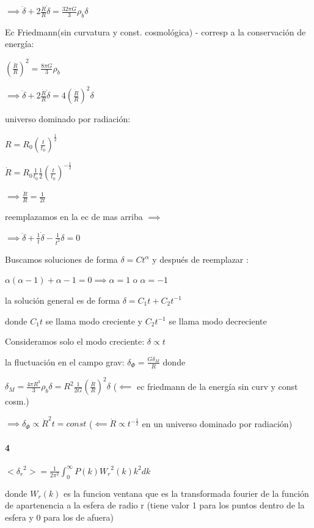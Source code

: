 \documentclass[12pt]{book}
\begin{document}
$\implies  \ddot{\delta} + 2  \frac{\dot{R}}{R} \dot{\delta} =  \frac{32 \pi G}{3}  \rho_b \delta $

Ec Friedmann(sin curvatura y const. cosmológica) - corresp a la conservación de energía:

$(\frac{\dot{R}}{R})^2 = \frac{8 \pi G }{3} \rho_b$

$\implies \ddot{\delta} + 2  \frac{\dot{R}}{R} \dot{\delta}  = 4 (\frac{\dot{R}}{R})^2 \delta$

universo dominado por radiación:

$R=R_0(\frac{t}{t_0})^{\frac{1}{2}}$

$\dot{R}=R_0\frac{1}{t_0}\frac{1}{2} (\frac{t}{t_0})^{-\frac{1}{2}}$

$\implies \frac{\dot{R}}{R} = \frac{1}{2t}$

reemplazamos en la ec de mas  arriba $\implies$

$\implies \ddot{\delta} +   \frac{1}{t} \dot{\delta}  -  \frac{1}{t^2} \delta = 0$

Buscamos soluciones de forma $\delta = C t^{\alpha}$ y después de reemplazar :

$\alpha(\alpha-1) + \alpha -1 = 0 \implies \alpha = 1$ o $\alpha = -1$

la solución general es de forma $\delta = C_1 t + C_2 t^{-1}$ 

donde $C_1 t $ se llama modo creciente y $ C_2 t^{-1}$ se llama modo decreciente

Consideramos solo el modo creciente: $\delta \propto  t$

la fluctuación en el campo grav:  $\delta_{\Phi} = \frac{G \delta_{M}}{R}$ donde

$\delta_M = \frac{4 \pi R^3}{3} \rho_b \delta = R^2 \frac{1}{2 G } (\frac{\dot{R}}{R})^2 \delta $ ($\impliedby $ ec friedmann de la energía sin curv y const cosm.)

$\implies \delta_{\Phi} \propto \dot{R}^2 t = const$ ($\impliedby \dot{R} \propto t^{-\frac{1}{2}}$ en un universo dominado por radiación)

\paragraph{4}

$<{\delta_r}^2> = \frac{1}{2\pi^2}\int_0^\infty{P(k){W_r}^2(k) k^2 dk }$

donde $W_r(k)$ es la funcion ventana que es la transformada fourier de la función de apartenencia a la esfera de radio r (tiene valor 1 para los puntos dentro de la esfera y 0 para los de afuera)
\end{document}
